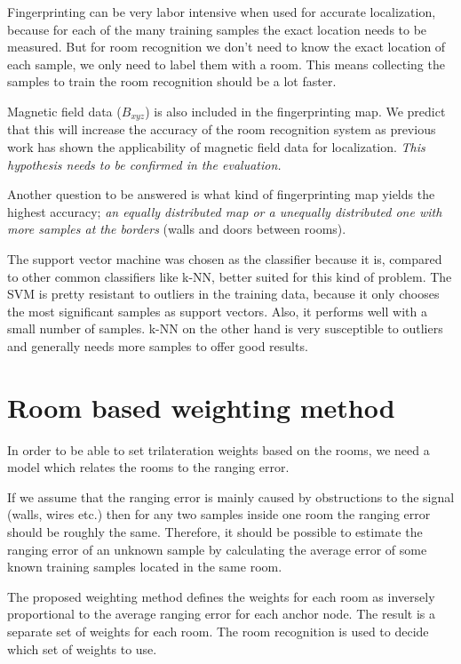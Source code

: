 Fingerprinting can be very labor intensive when used for accurate localization, because for each of the many training samples the exact location needs to be measured. But for room recognition we don't need to know the exact location of each sample, we only need to label them with a room. This means collecting the samples to train the room recognition should be a lot faster.

Magnetic field data ($B_{xyz}$) is also included in the fingerprinting map. We predict that this will increase the accuracy of the room recognition system as previous work has shown the applicability of magnetic field data for localization. \emph{This hypothesis needs to be confirmed in the evaluation.}

Another question to be answered is what kind of fingerprinting map yields the highest accuracy; \emph{an equally distributed map or a unequally distributed one with more samples at the borders }(walls and doors between rooms).

The support vector machine was chosen as the classifier because it is, compared to other common classifiers like k-NN, better suited for this kind of problem. The SVM is pretty resistant to outliers in the training data, because it only chooses the most significant samples as support vectors. Also, it performs well with a small number of samples. k-NN on the other hand is very susceptible to outliers and generally needs more samples to offer good results.

\section{Room based weighting method}
\label{WeightingModelDefinition}
In order to be able to set trilateration weights based on the rooms, we need a model which relates the rooms to the ranging error.

If we assume that the ranging error is mainly caused by obstructions to the signal (walls, wires etc.) then for any two samples inside one room the ranging error should be roughly the same. Therefore, it should be possible to estimate the ranging error of an unknown sample by calculating the average error of some known training samples located in the same room.

The proposed weighting method defines the weights for each room as inversely proportional to the average ranging error for each anchor node. The result is a separate set of weights for each room. The room recognition is used to decide which set of weights to use.

